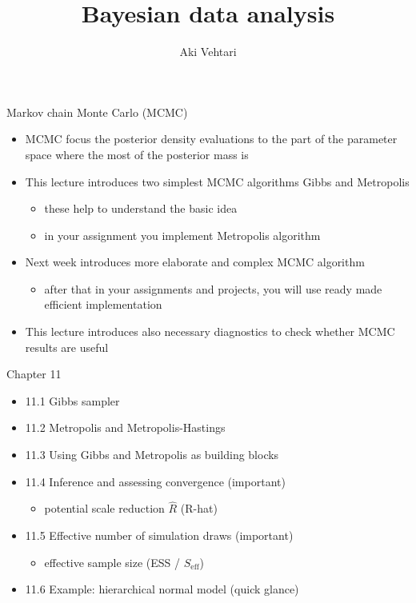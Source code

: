 \documentclass[finnish,english,t]{beamer}
\title[]{Bayesian data analysis}
\subtitle{}
\author{Aki Vehtari}
\institute[Aalto]{}
\def\eff{\text{eff}}
\def\Seff{S_\eff}
\begin{document}

\begin{frame}{Markov chain Monte Carlo (MCMC)}

  \begin{itemize}
  \item<+-> MCMC focus the posterior density evaluations to the part
    of the parameter space where the most of the posterior mass is
  \item<+-> This lecture introduces two simplest MCMC algorithms Gibbs
    and Metropolis
    \begin{itemize}
    \item these help to understand the basic idea
    \item in your assignment you implement Metropolis algorithm
    \end{itemize}
  \item<+-> Next week introduces more elaborate and complex MCMC algorithm
    \begin{itemize}
    \item after that in your assignments and projects, you will use
      ready made efficient implementation
    \end{itemize}
  \item<+-> This lecture introduces also necessary diagnostics to
    check whether MCMC results are useful
  \end{itemize}
  
\end{frame}

\begin{frame}{Chapter 11}

  \begin{itemize}
  \item 11.1 Gibbs sampler
  \item 11.2 Metropolis and Metropolis-Hastings
  \item 11.3 Using Gibbs and Metropolis as building blocks
  \item 11.4 Inference and assessing convergence (important)
    \begin{itemize}
    \item potential scale reduction $\widehat{R}$ (R-hat)
    \end{itemize}
  \item 11.5 Effective number of simulation draws (important)
    \begin{itemize}
    \item effective sample size (ESS / $\Seff$)
    \end{itemize}
  \item {\color{gray}11.6 Example: hierarchical normal model (quick glance)}
  \end{itemize}
\end{frame}
\end{document}
